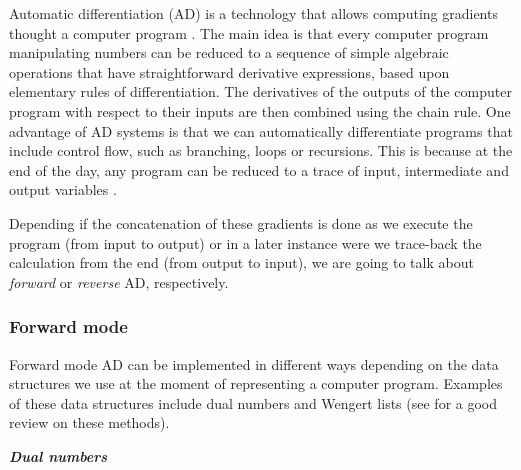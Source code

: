 Automatic differentiation (AD) is a technology that allows computing gradients thought a computer program \cite{griewank2008evaluatingderivatives}. 
The main idea is that every computer program manipulating numbers can be reduced to a sequence of simple algebraic operations that have straightforward derivative expressions, based upon elementary rules of differentiation.
The derivatives of the outputs of the computer program with respect to their inputs are then combined using the chain rule.
One advantage of AD systems is that we can automatically differentiate programs that include control flow, such as branching, loops or recursions. 
This is because at the end of the day, any program can be reduced to a trace of input, intermediate and output variables \cite{Baydin_Pearlmutter_Radul_Siskind_2015}.

Depending if the concatenation of these gradients is done as we execute the program (from input to output) or in a later instance were we trace-back the calculation from the end (from output to input), we are going to talk about \textit{forward} or \textit{reverse} AD, respectively.

\subsubsection{Forward mode}

Forward mode AD can be implemented in different ways depending on the data structures we use at the moment of representing a computer program. Examples of these data structures include dual numbers and Wengert lists (see \cite{Baydin_Pearlmutter_Radul_Siskind_2015} for a good review on these methods). 

\vspace*{10px}
\noindent \textbf{\textit{Dual numbers}}
\vspace*{5px}

